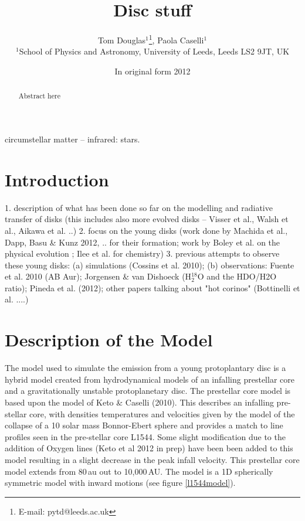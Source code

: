 \documentclass[useAMS,usenatbib]{mn2e}
\title[Disc stuff]{Disc stuff}
\author[Tom  Douglas, Paola Caselli, Et al.]{Tom Douglas$^{1}$\thanks{E-mail:
pytd@leeds.ac.uk}, Paola Caselli$^{1}$\\
$^{1}$School of Physics and Astronomy, University of Leeds, Leeds LS2 9JT, UK}
\begin{document}
\date{In original form 2012}

\pagerange{\pageref{firstpage}--\pageref{lastpage}} 

\maketitle

\label{firstpage}

\begin{abstract}
Abstract here
\end{abstract}

\begin{keywords}
circumstellar matter -- infrared: stars.
\end{keywords}

\section{Introduction}

1. description of what has been done so far on the modelling and radiative transfer of disks (this includes also more evolved disks -- Visser et al., Walsh et al., Aikawa et al. ..)
2. focus on the young disks (work done by Machida et al., Dapp, Basu \& Kunz 2012, .. for their formation; work by Boley et al. on the physical evolution ; Ilee et al. for chemistry) 
3. previous attempts to observe these young disks: (a) simulations (Cossins et al. 2010); (b) observations: Fuente et al. 2010 (AB Aur); Jorgensen \& van Dishoeck (H$_2^{18}$O and the HDO/H2O ratio); Pineda et al. (2012); other papers talking about "hot corinos" (Bottinelli et al. ....)

\section{Description of the Model}

The model used to simulate the emission from a young protoplantary disc is a hybrid model created from hydrodynamical models of an infalling prestellar core and a gravitationally unstable protoplanetary disc. The prestellar core model is based upon the model of Keto \& Caselli (2010). This describes an infalling pre-stellar core, with densities temperatures and velocities given by the model of the collapse of a 10 solar mass Bonnor-Ebert sphere and provides a match to line profiles seen in the pre-stellar core L1544. Some slight modification due to the addition of Oxygen lines (Keto et al 2012 in prep) have been been added to this model resulting in a slight decrease in the peak infall velocity. This prestellar core model extends from 80$\,$au out to 10,000$\,$AU. The model is a 1D spherically symmetric model with inward motions (see figure \ref{l1544model}).\newline
\end{document}
